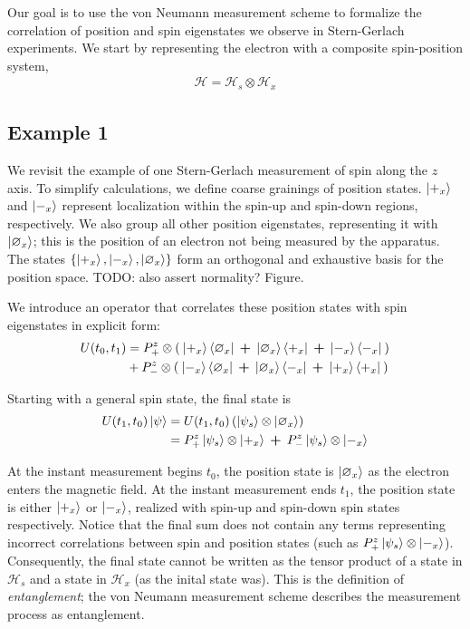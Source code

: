 Our goal is to use the von Neumann measurement scheme to formalize the correlation of position and spin eigenstates we observe in Stern-Gerlach experiments. We start by representing the electron with a composite spin-position system,
\begin{align}
  \mathcal{H} = \mathcal{H}_s \otimes \mathcal{H}_x
\end{align}

\subsection{Example 1}
We revisit the example of one Stern-Gerlach measurement of spin along the $z$ axis. To simplify calculations, we define coarse grainings of position states. $\ket{+_x}$ and $\ket{-_x}$ represent localization within the spin-up and spin-down regions, respectively. We also group all other position eigenstates, representing it with $\ket{\varnothing_x}$; this is the position of an electron not being measured by the apparatus. The states $\{\ket{+_x}, \ket{-_x}, \ket{\varnothing_x}\}$ form an orthogonal and exhaustive basis for the position space. TODO: also assert normality? Figure.

We introduce an operator that correlates these position states with spin eigenstates in explicit form:
\begin{align}
  U(t_0, t_1) &= P^z_+ \otimes \left(\: \ket{+_x}\bra{\varnothing_x} \: \bm{+} \: \ket{\varnothing_x}\bra{+_x} \: \bm{+} \: \ket{-_x}\bra{-_x} \: \right) \\ \nonumber
  &+ P^z_- \otimes \left( \: \ket{-_x}\bra{\varnothing_x} \: \bm{+} \: \ket{\varnothing_x}\bra{-_x} \: \bm{+} \: \ket{+_x}\bra{+_x} \: \right)
\end{align}

Starting with a general spin state, the final state is
\begin{align}
  U(t_1, t_0)\ket{\psi} & =  U(t_1, t_0) \left(\ket{\psi_s} \otimes \ket{\varnothing_x} \right) \\
  &= \nonumber P^z_+ \ket{\psi_s} \otimes \ket{+_x} \: \bm{+} \: P^z_- \ket{\psi_s} \otimes \ket{-_x}
\end{align}

At the instant measurement begins $t_0$, the position state is $\ket{\varnothing_x}$ as the electron enters the magnetic field. At the instant measurement ends $t_1$, the position state is either $\ket{+_x}$ or $\ket{-_x}$, realized with spin-up and spin-down spin states respectively. Notice that the final sum does not contain any terms representing incorrect correlations between spin and position states (such as $ P^z_+ \ket{\psi_s} \otimes \ket{-_x}$).  Consequently, the final state cannot be written as the tensor product of a state in $\mathcal{H}_s$ and a state in $\mathcal{H}_x$ (as the inital state was). This is the definition of \textit{entanglement}; the von Neumann measurement scheme describes the measurement process as entanglement.


